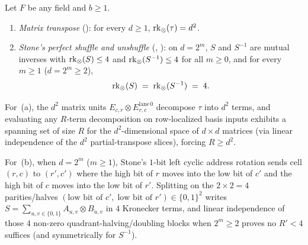 \begin{theorem}[Exact Operator Schmidt Rank: $\OSR(\tau) = d^2$ vs.\ $\OSR(S) = 4$]\label{thm:osr-swap}
\label{thm:osr-shuffle}
Let $F$ be any field and $b \ge 1$.
\begin{enumerate}[label=(\alph*)]
\item \emph{Matrix transpose} (): for every $d \ge 1$,
  $\OSR(\tau) = d^2$.
\item \emph{Stone's perfect shuffle and unshuffle} (,
  ): on $d = 2^m$, $S$ and $S^{-1}$ are mutual inverses with
  $\operatorname{rk}_{\otimes}(S) \le 4$ and $\operatorname{rk}_{\otimes}(S^{-1}) \le 4$ for all $m \ge 0$, and for every $m \ge 1$ ($d = 2^m \ge 2$),
  \[
    \operatorname{rk}_{\otimes}(S) \;=\; \operatorname{rk}_{\otimes}(S^{-1}) \;=\; 4.
  \]
\end{enumerate}
\end{theorem}
\begin{outline}
For~(a), the $d^2$ matrix units $E_{c,r} \otimes E_{r,c}^{\mathrm{lane\,0}}$ decompose $\tau$ into
$d^2$ terms, and evaluating any $R$-term decomposition on row-localized basis inputs exhibits a
spanning set of size $R$ for the $d^2$-dimensional space of $d\times d$ matrices (via linear
independence of the $d^2$ partial-transpose slices), forcing $R \ge d^2$.

For~(b), when $d = 2^m$ ($m \ge 1$), Stone's $1$-bit left cyclic address rotation sends cell
$(r, c)$ to $(r', c')$ where the high bit of $r$ moves into the low bit of $c'$ and the high bit
of $c$ moves into the low bit of $r'$. Splitting on the $2 \times 2 = 4$ parities/halves
$(\text{low bit of } c',\; \text{low bit of } r') \in \{0,1\}^2$ writes $S = \sum_{u,v \in \{0,1\}}
A_{u,v} \otimes B_{u,v}$ in $4$ Kronecker terms, and linear independence of those $4$ non-zero
quadrant-halving/doubling blocks when $2^m \ge 2$ proves no $R' < 4$ suffices (and symmetrically
for $S^{-1}$).
\end{outline}

